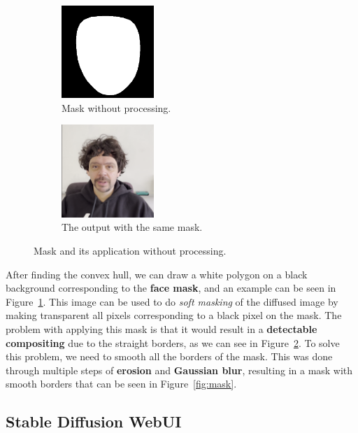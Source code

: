 \documentclass[preprint]{elsarticle}
\begin{document}
\begin{figure}[t]
	\centering
	\begin{subfigure}[b]{0.5\textwidth}
		\centering
		\includegraphics[width=3.5cm, keepaspectratio]{img/project_img/mask.png}
		\caption{Mask without processing.}\label{fig:mask-noblur}
	\end{subfigure}%
	\hfill
	\begin{subfigure}[b]{0.5\textwidth}
		\centering
		\includegraphics[width=3.5cm, keepaspectratio]{img/project_img/final-erorr.png}
		\caption{The output with the same mask.}\label{fig:mask-final-error}
	\end{subfigure}
	\caption{Mask and its application without processing.}\label{fig:eroor-mediapipe}
\end{figure}


After finding the convex hull, we can draw a white polygon on a black background corresponding to the \textbf{face mask},  and an example can be seen in Figure~\ref{fig:mask-noblur}. 
This image can be used to do \emph{soft masking} of the diffused image by making transparent all  pixels corresponding to a black pixel on the mask.  The problem with applying this mask is that it would result in a \textbf{detectable compositing} due to the straight borders, 
as we can see in Figure~\ref{fig:mask-final-error}.  To solve this problem, we need to smooth all the borders of the mask.  This was done through multiple steps of \textbf{erosion} and \textbf{Gaussian blur}, 
resulting in a mask with smooth borders that can be seen in Figure~\ref{fig:mask}.



\subsection{Stable Diffusion WebUI} \label{sec:stable_diffusion_webui}
\end{document}
